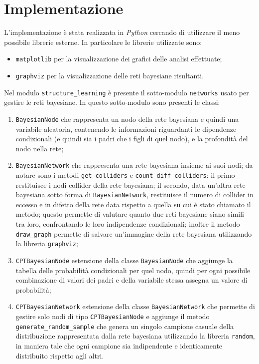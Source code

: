 \section{Implementazione}

L'implementazione è stata realizzata in \textit{Python} cercando di utilizzare il meno possibile
librerie esterne. In particolare le librerie utilizzate sono:
\begin{itemize}
      \item \texttt{matplotlib} per la visualizzazione dei grafici delle analisi effettuate;
      \item \texttt{graphviz} per la visualizzazione delle reti bayesiane risultanti.
\end{itemize}

Nel modulo \texttt{structure\_learning} è presente il sotto-modulo \texttt{networks} usato per
gestire le reti bayesiane. In questo sotto-modulo sono presenti le classi:
\begin{enumerate}
      \item \texttt{BayesianNode} che rappresenta un nodo della rete bayesiana e quindi una variabile aleatoria,
            contenendo le informazioni riguardanti le dipendenze condizionali (e quindi sia i padri che i figli di quel nodo),
            e la profondità del nodo nella rete;
      \item \texttt{BayesianNetwork} che rappresenta una rete bayesiana insieme ai suoi nodi; da notare sono i metodi
            \texttt{get\_colliders} e \texttt{count\_diff\_colliders}: il primo restituisce i nodi collider della rete bayesiana; 
            il secondo, data un'altra rete bayesiana sotto forma di \texttt{BayesianNetwork}, restituisce il numero di collider 
            in eccesso e in difetto della rete data rispetto a quella su cui è stato chiamato il metodo; questo permette di valutare
            quanto due reti bayesiane siano simili tra loro, confrontando le loro indipendenze condizionali;
            inoltre il metodo \texttt{draw\_graph} permette di salvare un'immagine della rete bayesiana utilizzando la libreria
            \texttt{graphviz};
      \item \texttt{CPTBayesianNode} estensione della classe \texttt{BayesianNode} che aggiunge la tabella delle probabilità
            condizionali per quel nodo, quindi per ogni possibile combinazione di valori dei padri e della variabile stessa assegna un
            valore di probabilità;
      \item \texttt{CPTBayesianNetwork} estensione della classe \texttt{BayesianNetwork} che permette di gestire solo nodi di tipo
            \texttt{CPTBayesianNode} e aggiunge il metodo \texttt{generate\_random\_sample} che genera un singolo campione casuale
            della distribuzione rappresentata dalla rete bayesiana utilizzando la libreria \texttt{random}, in maniera tale che ogni
            campione sia indipendente e identicamente distribuito rispetto agli altri.
\end{enumerate}

